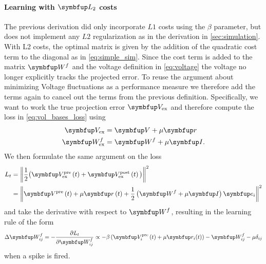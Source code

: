 \paragraph{Learning with $\bmu{L_2}$ costs}
The previous derivation did only incorporate $L1$ costs using the $\beta$ parameter, but does not implement any $L2$ regularization as in the derivation in \cref{sec:simulation}. With L2 costs, the optimal matrix is given by the addition of the quadratic cost term to the diagonal as in \cref{eq:simple_sim}. Since the cost term is added to the matrix $\bmu{W}^f$ and the voltage definition in \cref{eq:voltage} the voltage no longer explicitly tracks the projected error. To reuse the argument about minimizing Voltage fluctuations as a performance measure we therefore add the terms again to cancel out the terms from the previous definition. Specifically, we want to work the true projection error $\bmu{V}_{\text{ex}}$ and therefore compute the loss in \cref{eq:vol_bases_loss} using
\begin{equation}\label{eq:Wf_learning_rule_improved}
\begin{aligned}
	\bmu{V}_{\text{ex}} &= \bmu{V} + \mu\bmu{r}\\
	\bmu{W}^f_{\text{ex}} & = \bmu{W}^f + \mu\bmu{I}.
\end{aligned}
\end{equation}
We then formulate the same argument on the loss
\begin{equation}\label{eq:vol_bases_loss}
\begin{aligned}
L_t & =\left\|\frac{1}{2}\big(\bmu{V}^{\text {pre}}_{\text{ex}}\left(t\right)+\bmu{V}^{\text {post}}_\text{ex}\left(t\right)\big)\right\|^2 \\
& =\left\|\bmu{V}^{\text {pre}}\left(t\right)+ \mu\bmu{r}\left(t\right) + \frac{1}{2}\left(\bmu{W}^f + \mu \bmu{I}\right)\bmu{e}_{i}\right\|^2
\end{aligned}
\end{equation}
and take the derivative with respect to $\bmu{W}^f$, resulting in the learning rule of the form
\begin{equation}
\Delta \bmu{W}^f_{ij} =-\frac{\partial L_t}{\partial \bmu{W}^f_{ij}} \propto - \beta\left( \bmu{V}_i^{\text {pre}}\left(t\right) + \mu \bmu{r}_i(t)\right) -\bmu{W}^f_{ij} -\mu\delta_{ij}
\end{equation}
when a spike is fired.

